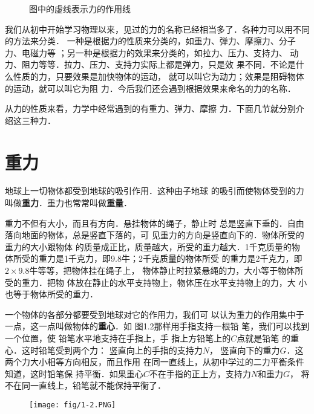 \begin{figure}[htp]\centering
{}
\caption{图中的虚线表示力的作用线}
\end{figure}

我们从初中开始学习物理以来，见过的力的名称已经相当多了．各种力可以用不同的方法来分类．
一种是根据力的性质来分类的，如重力、弹力、摩擦力、分子力、电磁力等
；另一种是根据力的效果来分类的，如拉力、压力、支持力、
动力、阻力等等．拉力、压力、支持力实际上都是弹力，只是效
果不同．不论是什么性质的力，只要效果是加快物体的运动，
就可以叫它为动力；效果是阻碍物体的运动，就可以叫它为阻
力．今后我们还会遇到根据效果来命名的力的名称．

    从力的性质来看，力学中经常遇到的有重力、弹力、摩擦
力．下面几节就分别介绍这三种力．


\section{重力}
    地球上一切物体都受到地球的吸引作用．这种由子地球
的吸引而使物体受到的力叫做\textbf{重力}．重力也常常叫做\textbf{重量}．

    重力不但有大小，而且有方向．悬挂物体的绳子，静止时
总是竖直下垂的．自由落向地面的物体，总是竖直下落的，可
见重力的方向是竖直向下的．物体所受的重力的大小跟物体
的质量成正比，质量越大，所受的重力越大．1千克质量的物
体所受的重力是1千克力，即9.8牛；2千克质量的物体所受
的重力是2千克力，即$2\times 9.8$牛等等，把物体挂在绳子上，
物体静止时拉紧悬绳的力，大小等于物体所受的重力．把物
体放在静止的水平支持物上，物体压在水平支持物上的力，大
小也等于物体所受的重力．

    一个物体的各部分都要受到地球对它的作用力，我们可
以认为重力的作用集中于一点，这一点叫做物体的\textbf{重心}．如
图1.2那样用手指支持一根铅
笔，我们可以找到一个位置，使
铅笔水平地支持在手指上，手
指上方铅笔上的$C$点就是铅笔
的重心．这时铅笔受到两个力：
竖直向上的手指的支持力$N$，
竖直向下的重力$G$．这两个力大小相等方向相反，而且作用
在同一直线上，从初中学过的二力平衡条件知道，这时铅笔保
持平衡．如果重心$C$不在手指的正上方，支持力$N$和重力$G$，
将不在同一直线上，铅笔就不能保持平衡了．
\begin{figure}[htp]
\centering
\texttt{[image: fig/1-2.PNG]}
\caption{}
\end{figure}

